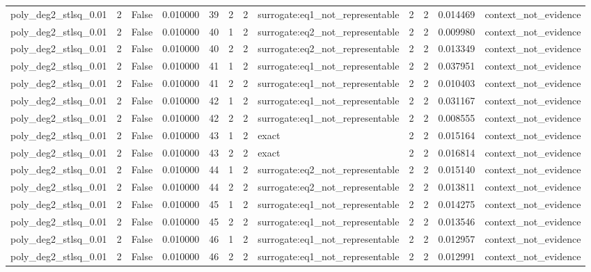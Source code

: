 \begin{tabular}{lrrrrrrlrrrl}
poly\_deg2\_stlsq\_0.01 & 2 & False & 0.010000 & 39 & 2 & 2 & surrogate:eq1\_not\_representable & 2 & 2 & 0.014469 & context\_not\_evidence \\
poly\_deg2\_stlsq\_0.01 & 2 & False & 0.010000 & 40 & 1 & 2 & surrogate:eq2\_not\_representable & 2 & 2 & 0.009980 & context\_not\_evidence \\
poly\_deg2\_stlsq\_0.01 & 2 & False & 0.010000 & 40 & 2 & 2 & surrogate:eq2\_not\_representable & 2 & 2 & 0.013349 & context\_not\_evidence \\
poly\_deg2\_stlsq\_0.01 & 2 & False & 0.010000 & 41 & 1 & 2 & surrogate:eq1\_not\_representable & 2 & 2 & 0.037951 & context\_not\_evidence \\
poly\_deg2\_stlsq\_0.01 & 2 & False & 0.010000 & 41 & 2 & 2 & surrogate:eq1\_not\_representable & 2 & 2 & 0.010403 & context\_not\_evidence \\
poly\_deg2\_stlsq\_0.01 & 2 & False & 0.010000 & 42 & 1 & 2 & surrogate:eq1\_not\_representable & 2 & 2 & 0.031167 & context\_not\_evidence \\
poly\_deg2\_stlsq\_0.01 & 2 & False & 0.010000 & 42 & 2 & 2 & surrogate:eq1\_not\_representable & 2 & 2 & 0.008555 & context\_not\_evidence \\
poly\_deg2\_stlsq\_0.01 & 2 & False & 0.010000 & 43 & 1 & 2 & exact & 2 & 2 & 0.015164 & context\_not\_evidence \\
poly\_deg2\_stlsq\_0.01 & 2 & False & 0.010000 & 43 & 2 & 2 & exact & 2 & 2 & 0.016814 & context\_not\_evidence \\
poly\_deg2\_stlsq\_0.01 & 2 & False & 0.010000 & 44 & 1 & 2 & surrogate:eq2\_not\_representable & 2 & 2 & 0.015140 & context\_not\_evidence \\
poly\_deg2\_stlsq\_0.01 & 2 & False & 0.010000 & 44 & 2 & 2 & surrogate:eq2\_not\_representable & 2 & 2 & 0.013811 & context\_not\_evidence \\
poly\_deg2\_stlsq\_0.01 & 2 & False & 0.010000 & 45 & 1 & 2 & surrogate:eq1\_not\_representable & 2 & 2 & 0.014275 & context\_not\_evidence \\
poly\_deg2\_stlsq\_0.01 & 2 & False & 0.010000 & 45 & 2 & 2 & surrogate:eq1\_not\_representable & 2 & 2 & 0.013546 & context\_not\_evidence \\
poly\_deg2\_stlsq\_0.01 & 2 & False & 0.010000 & 46 & 1 & 2 & surrogate:eq1\_not\_representable & 2 & 2 & 0.012957 & context\_not\_evidence \\
poly\_deg2\_stlsq\_0.01 & 2 & False & 0.010000 & 46 & 2 & 2 & surrogate:eq1\_not\_representable & 2 & 2 & 0.012991 & context\_not\_evidence \\

\end{tabular}
